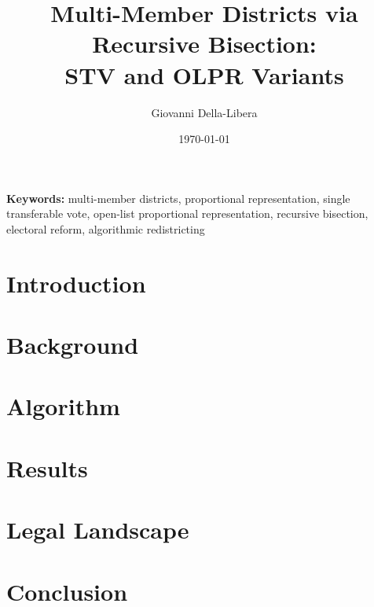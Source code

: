 \documentclass[12pt]{article}
\title{Multi-Member Districts via Recursive Bisection:\\
STV and OLPR Variants}
\author{Giovanni Della-Libera}
\date{\today}
\begin{document}
\maketitle

\begin{abstract}

\end{abstract}

\noindent\textbf{Keywords:} multi-member districts, proportional representation,
single transferable vote, open-list proportional representation,
recursive bisection, electoral reform, algorithmic redistricting

\section{Introduction}


\section{Background}


\section{Algorithm}


\section{Results}


\section{Legal Landscape}


\section{Conclusion}




\end{document}
